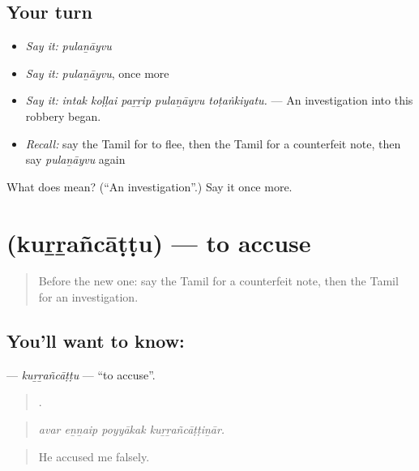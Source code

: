 \subsection*{Your turn}
\begin{itemize}
\raggedright
  \item \emph{Say it:} \emph{pulaṉāyvu}
  \item \emph{Say it:} \emph{pulaṉāyvu}, once more
  \item \emph{Say it:} \emph{intak koḷḷai paṟṟip pulaṉāyvu toṭaṅkiyatu.} — An investigation into this robbery began.
  \item \emph{Recall:} say the Tamil for to flee, then the Tamil for a counterfeit note, then say \emph{pulaṉāyvu} again
\end{itemize}

\begin{tcolorbox}[breakable,colback=teal!4,colframe=teal!35!black,title={Before you move on}]
What does  mean? (\textquotedblleft{}An investigation\textquotedblright{}.) Say it once more.
\end{tcolorbox}
\section[\texorpdfstring{\ta{குற்றஞ்சாட்டு} (kuṟṟañcāṭṭu)}{குற்றஞ்சாட்டு (kuṟṟañcāṭṭu)}]{ (kuṟṟañcāṭṭu) — to accuse}

\label{lesson:TA-C297-kurrancattu}



\begin{quote}
Before the new one: say the Tamil for a counterfeit note, then the Tamil for an investigation.
\end{quote}

\subsection*{You'll want to know: }
\textbf{} — \emph{kuṟṟañcāṭṭu} — \textquotedblleft{}to accuse\textquotedblright{}.

\begin{quote}
   .
\end{quote}

\begin{quote}
\emph{avar eṉṉaip poyyākak kuṟṟañcāṭṭiṉār.}
\end{quote}

\begin{quote}
He accused me falsely.
\end{quote}

